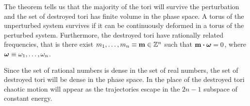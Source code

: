 \documentclass[../thesis.tex]{subfiles}
\theoremstyle{plain}
\begin{document}
The theorem tells us that the majority of the tori will survive the perturbation
and the set of destroyed tori has finite volume in the phase space.
A torus of the unperturbed system survives if it can be continuously deformed
in a torus of the perturbed system.
Furthermore, the destroyed tori have rationally related frequencies, that is
there exist \(m_1,\dotsc,m_n \equiv \vb{m} \in \mathbb{Z}^n\) such that
\(\vb{m} \vdot \vb*{\omega} = 0\), where \(\vb*{\omega} \equiv \omega_1,\dotsc,\omega_n\).

Since the set of rational numbers is dense in the set of real numbers,
the set of destroyed tori will be dense in the phase space. In the
place of the destroyed tori chaotic motion will appear as the trajectories escape
in the \(2n-1\) subspace of constant energy.
\end{document}
